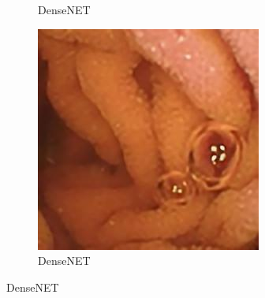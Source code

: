 \begin{figure}[H]
\begin{subfigure}[b]{0.275\textwidth}
    \caption{DenseNET}
  \end{subfigure}
  \begin{subfigure}[b]{0.275\textwidth}
    \includegraphics[width=\textwidth]{Chapter7/Dense_456.jpg}
    \caption{DenseNET}
  \end{subfigure}


\end{figure}
